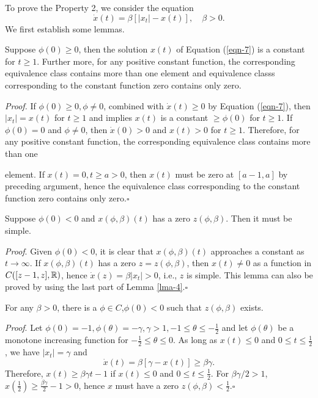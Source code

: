 \begin{frame}[t]
  To prove the Property 2, we consider the equation
  \begin{equation}\label{eqn-7}
    \dot{x}(t)=\beta[|x_t|-x(t)],\quad \beta>0.
  \end{equation}
We first establish some lemmas.

\begin{lemma}\label{lma-4}
  Suppose $\phi(0)\ge 0$, then the solution  $x(t)$ of Equation (\ref{eqn-7}) is a constant for $t\ge 1$. Further more, for any positive constant function, the corresponding equivalence class contains more than one element and equivalence classs corresponding to the constant function zero contains only zero.
\end{lemma}
{\noindent \itshape Proof.}
If $\phi(0)\ge 0,\phi\neq 0$, combined with $\dot{x}(t)\ge 0$ by Equation (\ref{eqn-7}), then $|x_t|=x(t)$ for $t\ge 1$ and implies $x(t)$ is a constant $\ge \phi(0)$ for $t\ge 1$. 
If  $\phi(0)=0$ and $\phi\neq 0$, then $\dot{x}(0)>0$ and $x(t)>0$ for $t\ge 1$. Therefore, for any positive constant function, the corresponding equivalence class contains more than one
\end{frame}
\begin{frame}[t]
element. If  $x(t)=0,t\ge a>0$, then $x(t)$ must be zero at $[a-1,a]$ by preceding
argument, hence the equivalence class corresponding to the constant function zero contains only zero.\hfill $\square$\par
\begin{lemma}\label{lma-5}
  Suppose $\phi(0)<0$ and $x(\phi,\beta)(t)$ has a zero $z(\phi,\beta)$. Then it must be simple.
\end{lemma}
{\noindent \itshape Proof}.
Given $\phi(0)<0$, it is clear that $x(\phi,\beta)(t)$ approaches a constant as $t\to \infty$. If $x(\phi,\beta)(t)$ has a zero $z=z(\phi,\beta)$, then $x(t)\neq 0$ as a function in $C([z-1,z],\mathbb{R})$, hence $\dot{x}(z)=\beta|x_t|>0$, i.e., $z$ is simple. This lemma can also be proved by using the last part of Lemma \ref{lma-4}.\hfill $\square$ \par
\end{frame}

\begin{frame}[t]
  \begin{lemma}
    For any $\beta>0$, there is a $\phi \in C$,$\phi(0)<0$ such that $z(\phi,\beta)$ exists.
  \end{lemma}
  {\noindent \itshape Proof}.
Let $\phi(0)=-1,\phi(\theta)=-\gamma,\gamma>1,-1\le \theta\le-\frac{1}{2}$ and let $\phi(\theta)$ be a monotone increasing function for $-\frac{1}{2}\le \theta \le 0$. As long as $x(t)\le 0$ and $0\le t\le \frac{1}{2}$, we have
$|x_t|=\gamma$ and 
\[
  \dot{x}(t)=\beta[\gamma-x(t)]\ge \beta\gamma.
\] 
Therefore, $x(t)\ge \beta\gamma t-1$ if $x(t)\le 0$ and $0\le t\le \frac{1}{2}$. For $\beta\gamma /2>1$, $x(\frac{1}{2})\ge\frac{\beta\gamma}{2}-1>0$, hence $x$ must have a zero $z(\phi,\beta)<\frac{1}{2}$.\hfill $\square$\par
\end{frame}

